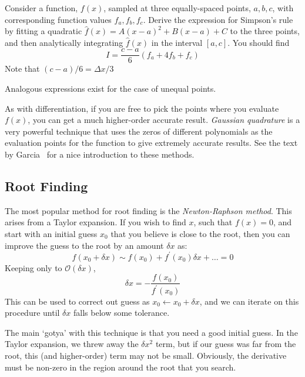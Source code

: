 \begin{exercise}
Consider a function, $f(x)$, sampled at three equally-spaced points,
$a, b, c$, with corresponding function values $f_a, f_b, f_c$.  Derive
the expression for Simpson's rule by fitting a quadratic $\hat{f}(x) =
A(x - a)^2 + B(x - a) + C$ to the three points, and then analytically
integrating $\hat{f}(x)$ in the interval $[a,c]$.  You should find
\begin{equation}
I = \frac{c-a}{6} (f_a + 4f_b + f_c)
\end{equation}
Note that $(c-a)/6 = \Delta x/3$
\end{exercise}

Analogous expressions exist for the case of unequal points.

As with differentiation, if you are free to pick the points where you
evaluate $f(x)$, you can get a much higher-order accurate result.
{\em Gaussian quadrature} is a very powerful technique that uses the
zeros of different polynomials as the evaluation points for the
function to give extremely accurate results.  See the text by
Garcia~\cite{garcia} for a nice introduction to these methods.


\subsection{Root Finding}

The most popular method for root finding is the {\em Newton-Raphson method}.
This arises from a Taylor expansion.  If you wish to find $x$, such that
$f(x) = 0$, and start with an initial guess $x_0$ that you believe is
close to the root, then you can improve the guess to the root by an amount
$\delta x$ as:
\begin{equation}
f(x_0 + \delta x) \sim f(x_0) + f^\prime(x_0) \delta x + \ldots = 0
\end{equation}
Keeping only to $\mathcal{O}(\delta x)$, 
\begin{equation}
\delta x = -\frac{f(x_0)}{f^\prime(x_0)}
\end{equation}
This can be used to correct out guess as $x_0 \leftarrow x_0 + \delta
x$, and we can iterate on this procedure until $\delta x$ falls below
some tolerance.

The main `gotya' with this technique is that you need a good initial guess.
In the Taylor expansion, we threw away the $\delta x^2$ term, but if our
guess was far from the root, this (and higher-order) term may not be small.
Obviously, the derivative must be non-zero in the region around the 
root that you search.

